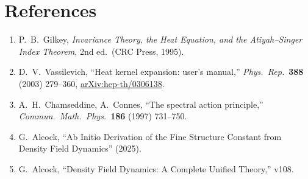 \documentclass[12pt,a4paper]{article}
\theoremstyle{definition}
\begin{document}
\section*{References}

\begin{enumerate}
\item[{[1]}] P.~B.~Gilkey, \textit{Invariance Theory, the Heat Equation,
  and the Atiyah--Singer Index Theorem}, 2nd ed.\ (CRC Press, 1995).

\item[{[2]}] D.~V.~Vassilevich, ``Heat kernel expansion: user's manual,''
  \textit{Phys.\ Rep.}\ \textbf{388} (2003) 279--360,
  \href{https://arxiv.org/abs/hep-th/0306138}{arXiv:hep-th/0306138}.

\item[{[3]}] A.~H.~Chamseddine, A.~Connes, ``The spectral action principle,''
  \textit{Commun.\ Math.\ Phys.}\ \textbf{186} (1997) 731--750.

\item[{[4]}] G.~Alcock, ``Ab Initio Derivation of the Fine Structure Constant
  from Density Field Dynamics'' (2025).

\item[{[5]}] G.~Alcock, ``Density Field Dynamics: A Complete Unified Theory,''
  v108.
\end{enumerate}
\end{document}
